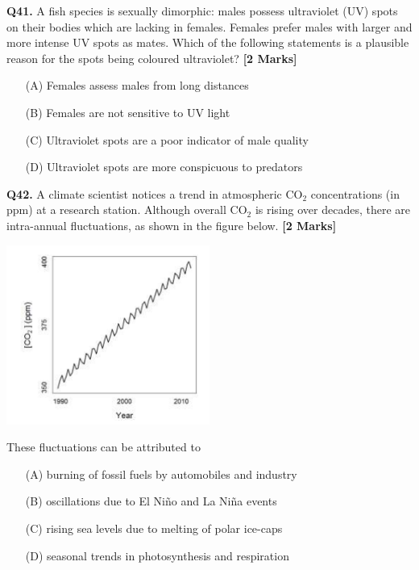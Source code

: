\documentclass[11pt]{article}
\newcommand{\questionb}[2]{
    \noindent\textbf{Q#2.} #1 \hfill \textbf{[2 Marks]}
}
\begin{document}
\questionb{A fish species is sexually dimorphic: males possess ultraviolet (UV) spots on their bodies which are lacking in females. Females prefer males with larger and more intense UV spots as mates. Which of the following statements is a plausible reason for the spots being coloured ultraviolet?}{41}
\begin{enumerate}
    \item[(A)] Females assess males from long distances
    \item[(B)] Females are not sensitive to UV light
    \item[(C)] Ultraviolet spots are a poor indicator of male quality
    \item[(D)] Ultraviolet spots are more conspicuous to predators
\end{enumerate}
\vspace{0.5cm}

\questionb{A climate scientist notices a trend in atmospheric CO\(_2\) concentrations (in ppm) at a research station. Although overall CO\(_2\) is rising over decades, there are intra-annual fluctuations, as shown in the figure below.}{42}
\begin{center}
\includegraphics[width=0.5\textwidth]{figures/42}
\end{center}
These fluctuations can be attributed to
\begin{enumerate}
    \item[(A)] burning of fossil fuels by automobiles and industry
    \item[(B)] oscillations due to El Niño and La Niña events
    \item[(C)] rising sea levels due to melting of polar ice-caps
    \item[(D)] seasonal trends in photosynthesis and respiration
\end{enumerate}
\vspace{0.5cm}
\end{document}
